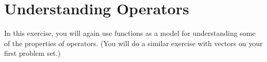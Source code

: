 %
%
%

\section*{Understanding Operators}

	In this exercise, you will again use functions as a model for understanding some of the properties of operators.
	(You will do a similar exercise with vectors on your first problem set.)

